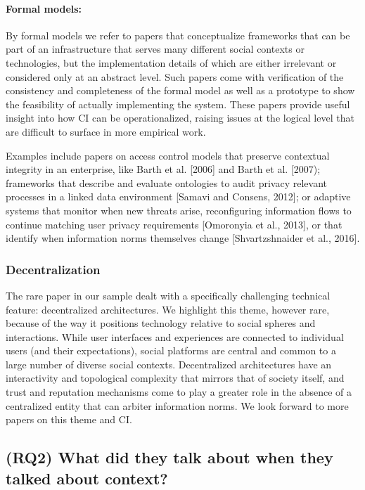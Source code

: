 \documentclass[../thesis.tex]{subfiles}
\begin{document}
\paragraph{Formal models:} By formal models we refer to papers that
conceptualize frameworks that can be part of an infrastructure that
serves many different social contexts or technologies, but the
implementation details of which are either irrelevant or considered
only at an abstract level. Such papers come with verification of the
consistency and completeness of the formal model as well as a prototype
to show the feasibility of actually implementing the system. These
papers provide useful insight into how CI can be operationalized,
raising issues at the logical level that are difficult to surface in
more empirical work.

Examples include papers on access control models that preserve
contextual integrity in an enterprise, like Barth et al. [2006] and
Barth et al. [2007); frameworks that describe and evaluate ontologies
to audit privacy relevant processes in a linked data environment
[Samavi and Consens, 2012]; or adaptive systems that monitor when new
threats arise, reconfiguring information flows to continue matching
user privacy requirements [Omoronyia et al., 2013], or that identify
when information norms themselves change [Shvartzshnaider et al.,
2016]. 

\subsubsection{Decentralization}
\label{CI4.1.3}

The rare paper in our sample dealt with a specifically challenging
technical feature: decentralized architectures. We highlight this
theme, however rare, because of the way it positions technology
relative to social spheres and interactions. While user interfaces and
experiences are connected to individual users (and their expectations),
social platforms are central and common to a large number of diverse
social contexts. Decentralized architectures have an interactivity and
topological complexity that mirrors that of society itself, and trust
and reputation mechanisms come to play a greater role in the absence of
a centralized entity that can arbiter information norms. We look
forward to more papers on this theme and CI.

\subsection{(RQ2) What did they talk about when they talked about context?}
\label{CI4.2}
\end{document}
